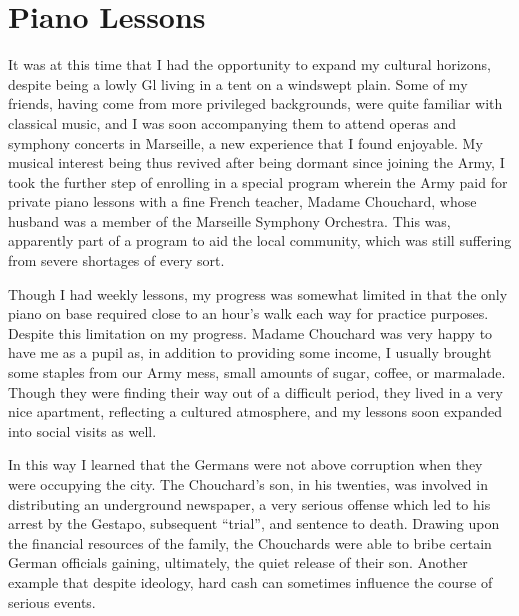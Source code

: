 \documentclass[../m3y]{subfiles}
\begin{document}
\section{Piano Lessons}
It was at this time that I had the opportunity to expand my cultural horizons, despite being a lowly Gl living in a tent on a windswept plain. Some of my friends, having come from more privileged backgrounds, were quite familiar with classical music, and I was soon accompanying them to attend operas and symphony concerts in Marseille, a new experience that I found enjoyable. My musical interest being thus revived after being dormant since joining the Army, I took the further step of enrolling in a special program wherein the Army paid for private piano lessons with a fine French teacher, Madame Chouchard, whose husband was a member of the Marseille Symphony Orchestra. This was, apparently part of a program to aid the local community, which was still suffering from severe shortages of every sort.

Though I had weekly lessons, my progress was somewhat limited in that the only piano on base required close to an hour's walk each way for practice purposes. Despite this limitation on my progress. Madame Chouchard was very happy to have me as a pupil as, in addition to providing some income, I usually brought some staples from our Army mess, small amounts of sugar, coffee, or marmalade. Though they were finding their way out of a difficult period, they lived in a very nice apartment, reflecting a cultured atmosphere, and my lessons soon expanded into social visits as well.

In this way I learned that the Germans were not above corruption when they were occupying the city. The Chouchard's son, in his twenties, was involved in distributing an underground newspaper, a very serious offense which led to his arrest by the Gestapo, subsequent ``trial'', and sentence to death. Drawing upon the financial resources of the family, the Chouchards were able to bribe certain German officials gaining, ultimately, the quiet release of their son. Another example that despite ideology, hard cash can sometimes influence the course of serious events.
\end{document}
